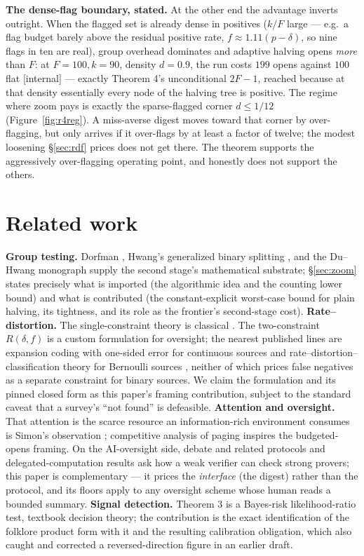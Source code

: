 \documentclass[11pt,a4paper]{article}
\begin{document}
\textbf{The dense-flag boundary, stated.} At the other end the advantage inverts outright. When the flagged set is already dense in positives ($k/F$ large --- e.g.\ a flag budget barely above the residual positive rate, $f\approx1.11(p-\delta)$, so nine flags in ten are real), group overhead dominates and adaptive halving opens \emph{more} than $F$: at $F{=}100,k{=}90$, density $d{=}0.9$, the run costs $199$ opens against $100$ flat [internal] --- exactly Theorem 4's unconditional $2F-1$, reached because at that density essentially every node of the halving tree is positive. The regime where zoom pays is exactly the sparse-flagged corner $d\le1/12$ (Figure~\ref{fig:r4reg}). A miss-averse digest moves toward that corner by over-flagging, but only arrives if it over-flags by at least a factor of twelve; the modest loosening \S\ref{sec:rdf} prices does not get there. The theorem supports the aggressively over-flagging operating point, and honestly does not support the others.





\section{Related work}\label{sec:related}
\textbf{Group testing.} Dorfman \cite{dorfman}, Hwang's generalized binary splitting \cite{hwang}, and the Du--Hwang monograph \cite{duhwang} supply the second stage's mathematical substrate; \S\ref{sec:zoom} states precisely what is imported (the algorithmic idea and the counting lower bound) and what is contributed (the constant-explicit worst-case bound for plain halving, its tightness, and its role as the frontier's second-stage cost).
\textbf{Rate--distortion.} The single-constraint theory is classical \cite{shannon,coverthomas}. The two-constraint $R(\delta,f)$ is a custom formulation for oversight; the nearest published lines are expansion coding with one-sided error for continuous sources \cite{expansion} and rate--distortion--classification theory for Bernoulli sources \cite{rdc}, neither of which prices false negatives as a separate constraint for binary sources. We claim the formulation and its pinned closed form as this paper's framing contribution, subject to the standard caveat that a survey's ``not found'' is defeasible.
\textbf{Attention and oversight.} That attention is the scarce resource an information-rich environment consumes is Simon's observation \cite{simon}; competitive analysis of paging \cite{sleatortarjan} inspires the budgeted-opens framing. On the AI-oversight side, debate and related protocols \cite{irving} and delegated-computation results \cite{gkr} ask how a weak verifier can check strong provers; this paper is complementary --- it prices the \emph{interface} (the digest) rather than the protocol, and its floors apply to any oversight scheme whose human reads a bounded summary.
\textbf{Signal detection.} Theorem 3 is a Bayes-risk likelihood-ratio test, textbook decision theory; the contribution is the exact identification of the folklore product form with it and the resulting calibration obligation, which also caught and corrected a reversed-direction figure in an earlier draft.
\end{document}

